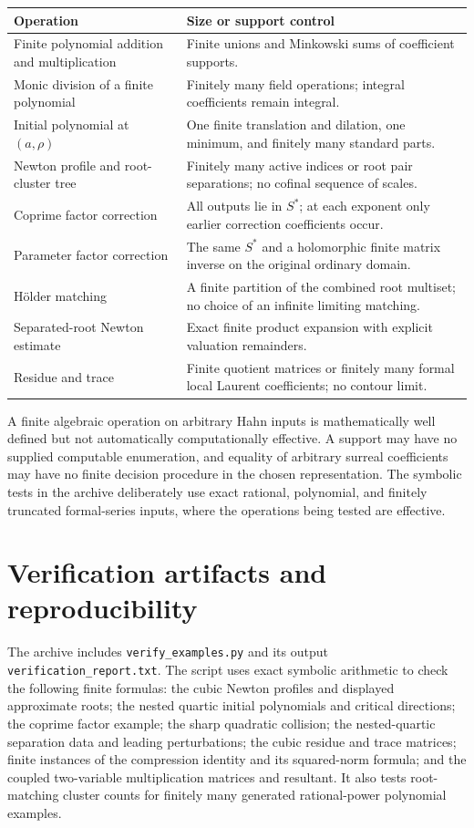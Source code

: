 \documentclass[11pt,letterpaper]{article}
\numberwithin{equation}{section}
\theoremstyle{definition}
\theoremstyle{remark}\newtheorem{remark}[theorem]{Remark}
\begin{document}
\begin{center}
\begin{tabularx}{\textwidth}{@{}LL@{}}
\toprule
Operation & Size or support control\\
\midrule
Finite polynomial addition and multiplication & Finite unions and
Minkowski sums of coefficient supports.\\[0.4em]
Monic division of a finite polynomial & Finitely many field operations;
integral coefficients remain integral.\\[0.4em]
Initial polynomial at $(a,\rho)$ & One finite translation and dilation,
one minimum, and finitely many standard parts.\\[0.4em]
Newton profile and root-cluster tree & Finitely many active indices or
root pair separations; no cofinal sequence of scales.\\[0.4em]
Coprime factor correction & All outputs lie in $S^*$; at each exponent
only earlier correction coefficients occur.\\[0.4em]
Parameter factor correction & The same $S^*$ and a holomorphic finite
matrix inverse on the original ordinary domain.\\[0.4em]
H\"older matching & A finite partition of the combined root multiset;
no choice of an infinite limiting matching.\\[0.4em]
Separated-root Newton estimate & Exact finite product expansion with
explicit valuation remainders.\\[0.4em]
Residue and trace & Finite quotient matrices or finitely many formal
local Laurent coefficients; no contour limit.\\
\bottomrule
\end{tabularx}
\end{center}
A finite algebraic operation on arbitrary Hahn inputs is mathematically
well defined but not automatically computationally effective. A support
may have no supplied computable enumeration, and equality of arbitrary
surreal coefficients may have no finite decision procedure in the
chosen representation. The symbolic tests in the archive deliberately
use exact rational, polynomial, and finitely truncated formal-series
inputs, where the operations being tested are effective.

\section{Verification artifacts and reproducibility}\label{app:verification}
The archive includes \texttt{verify\_examples.py} and its output
\texttt{verification\_report.txt}. The script uses exact symbolic
arithmetic to check the following finite formulas: the cubic Newton
profiles and displayed approximate roots; the nested quartic initial
polynomials and critical directions; the coprime factor example; the
sharp quadratic collision; the nested-quartic separation data and
leading perturbations; the cubic residue and trace matrices; finite
instances of the compression identity and its squared-norm formula;
and the coupled two-variable multiplication matrices and resultant.
It also tests root-matching cluster counts for finitely many generated
rational-power polynomial examples.
\end{document}
